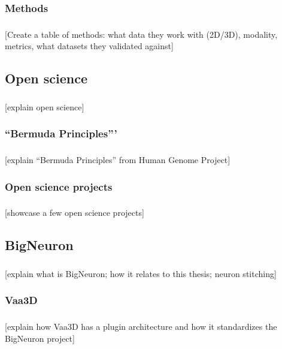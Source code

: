 \documentclass{beamer}
\begin{document}
\subsubsection{Methods}
\begin{frame}\frametitle{\subsubsecname}
	[Create a table of methods: what data they work with (2D/3D), modality, metrics, what datasets they validated against]
\end{frame}

\subsection{Open science}
\begin{frame}\frametitle{\subsecname}
	[explain open science]
\end{frame}

\subsubsection{``Bermuda Principles'''}
\begin{frame}\frametitle{\subsubsecname}
	[explain ``Bermuda Principles'' from Human Genome Project]
\end{frame}

\subsubsection{Open science projects}
\begin{frame}\frametitle{\subsubsecname}
	[showcase a few open science projects]
\end{frame}

\subsection{BigNeuron}
\begin{frame}\frametitle{\subsecname}
	[explain what is BigNeuron; how it relates to this thesis;
		neuron stitching]
\end{frame}

\subsubsection{Vaa3D}
\begin{frame}\frametitle{\subsecname}
	[explain how Vaa3D has a plugin architecture and how it
	standardizes the BigNeuron project]
\end{frame}
\end{document}
